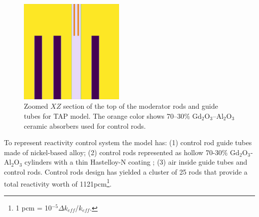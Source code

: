 \documentclass[12pt]{article} %
\begin{document}
\begin{figure}[htp!] %
  \centering
		  \includegraphics[width=0.45\textwidth]{tap_elev_view_zoomed.png}
		 \vspace{-0.2in}
  \caption{Zoomed $XZ$ section of the top of the moderator rods and guide tubes for \gls{TAP} model. The orange color shows 70–30\% Gd$_2$O$_3$–Al$_2$O$_3$ ceramic 
absorbers used for control rods.}
  \label{fig:tap-serpent-elev-zoom}
\end{figure}

To represent reactivity control system the 
model has: (1) control rod guide tubes made of nickel-based alloy; (2) control rods represented as hollow 70-30\% Gd$_2$O$_3$-Al$_2$O$_3$ cylinders with a thin 
Hastelloy-N coating \cite{betzler_assessment_2017}; (3) air inside guide tubes and 
control rods. Control rods design has yielded a cluster of 25 rods that provide a total reactivity worth of 1121pcm\footnote{ 1 pcm = 10$^{-5}\Delta k_{eff}/k_{eff}$.}.
\end{document}
